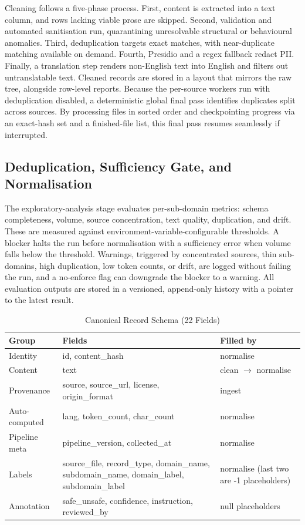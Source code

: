 \documentclass[conference]{IEEEtran}
\begin{document}
Cleaning follows a five-phase process. First, content is extracted into a text column, and rows lacking viable prose are skipped. Second, validation and automated sanitisation run, quarantining unresolvable structural or behavioural anomalies. Third, deduplication targets exact matches, with near-duplicate matching available on demand. Fourth, Presidio and a regex fallback redact PII. Finally, a translation step renders non-English text into English and filters out untranslatable text. Cleaned records are stored in a layout that mirrors the raw tree, alongside row-level reports. Because the per-source workers run with deduplication disabled, a deterministic global final pass identifies duplicates split across sources. By processing files in sorted order and checkpointing progress via an exact-hash set and a finished-file list, this final pass resumes seamlessly if interrupted.

\subsection{Deduplication, Sufficiency Gate, and Normalisation}

The exploratory-analysis stage evaluates per-sub-domain metrics: schema completeness, volume, source concentration, text quality, duplication, and drift. These are measured against environment-variable-configurable thresholds. A blocker halts the run before normalisation with a sufficiency error when volume falls below the threshold. Warnings, triggered by concentrated sources, thin sub-domains, high duplication, low token counts, or drift, are logged without failing the run, and a no-enforce flag can downgrade the blocker to a warning. All evaluation outputs are stored in a versioned, append-only history with a pointer to the latest result.

\begin{table}[t]
\caption{Canonical Record Schema (22 Fields)}
\label{tab:schema}
\centering
\renewcommand{\arraystretch}{1.2}
\begin{tabular}{|p{1.5cm}|p{1.8cm}|p{3.6cm}|}
\hline
Group & Fields & Filled by \\ \hline
Identity & id, content\_hash & normalise \\ \hline
Content & text & clean $\rightarrow$ normalise \\ \hline
Provenance & source, source\_url, license, origin\_format & ingest \\ \hline
Auto-computed & lang, token\_count, char\_count & normalise \\ \hline
Pipeline meta & pipeline\_version, collected\_at & normalise \\ \hline
Labels & source\_file, record\_type, domain\_name, subdomain\_name, domain\_label, subdomain\_label & normalise (last two are -1 placeholders) \\ \hline
Annotation & safe\_unsafe, confidence, instruction, reviewed\_by & null placeholders \\ \hline
\end{tabular}
\end{table}
\end{document}
